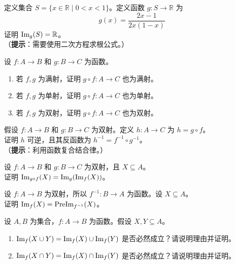 \begin{exercise}
    定义集合 $S = \{x \in \mathbb{R} \mid 0 < x < 1\}$。定义函数 $g:S \to \mathbb{R}$ 为
    \[g(x) = \frac{2x-1}{2x(1-x)}\]
    证明 $\text{Im}_g(S) = \mathbb{R}$。\\
    （\textbf{提示}：需要使用二次方程求根公式。）
\end{exercise}

\begin{exercise}
    设 $f : A \to B$ 和 $g : B \to C$ 为函数。
    \begin{enumerate}[label=(\alph*)]
        \item 若 $f, g$ 为满射，证明 $g \circ f : A \to C$ 也为满射。
        \item 若 $f, g$ 为单射，证明 $g \circ f : A \to C$ 也为单射。
        \item 若 $f, g$ 为双射，证明 $g \circ f : A \to C$ 也为双射。
    \end{enumerate} \label{exc:exercises7.8.9}
\end{exercise}

\begin{exercise}
    假设 $f : A \to B$ 和 $g : B \to C$ 为双射。定义 $h : A \to C$ 为 $h = g \circ f$。\\
    证明 $h$ 可逆，且其反函数为 $h^{-1} = f^{-1} \circ g^{-1}$。\\
    （\textbf{提示}：利用函数复合结合律。）\label{exc:exercises7.8.10}
\end{exercise} 

\begin{exercise}
    设 $f : A \to B$ 和 $g : B \to C$ 为双射，且 $X \subseteq A$。\\
    证明 $\text{Im}_{g \circ f} (X) = \text{Im}_g(\text{Im}_f (X))$。
\end{exercise}

\begin{exercise}
    设 $f : A \to B$ 为双射，所以 $f^{-1} : B \to A$ 为函数。设 $X \subseteq A$。\\
    证明 $\text{Im}_f (X) = \text{PreIm}_{f^{-1}} (X)$。
\end{exercise}

\begin{exercise}
    设 $A, B$ 为集合，$f : A \to B$ 为函数。假设 $X,Y \subseteq A$。
    \begin{enumerate}[label=(\alph*)]
        \item $\text{Im}_f (X \cup Y) = \text{Im}_f (X) \cup \text{Im}_f (Y)$ 是否必然成立？请说明理由并证明。
        \item $\text{Im}_f (X \cap Y) = \text{Im}_f (X) \cap \text{Im}_f (Y)$ 是否必然成立？请说明理由并证明。
    \end{enumerate}
\end{exercise}


